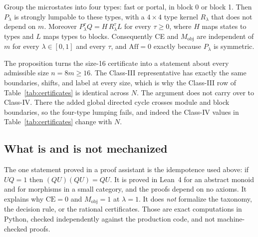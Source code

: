 \begin{proposition}
\label{prop:lumpability}
Group the microstates into four types: fast or portal, in block 0 or block 1. Then $P_\lambda$ is strongly lumpable to these types, with a $4\times4$ type kernel $R_\lambda$ that does not depend on $m$. Moreover $P_\lambda^{\tau}Q=H\,R_\lambda^{\tau}L$ for every $\tau\ge0$, where $H$ maps states to types and $L$ maps types to blocks. Consequently CE and $M_{\mathrm{obj}}$ are independent of $m$ for every $\lambda\in[0,1]$ and every $\tau$, and $\mathrm{Aff}=0$ exactly because $P_\lambda$ is symmetric.
\end{proposition}

The proposition turns the size-16 certificate into a statement about every admissible size $n=8m\ge16$. The Class-III representative has exactly the same boundaries, shifts, and label at every size, which is why the Class-III row of Table~\ref{tab:certificates} is identical across $N$. The argument does not carry over to Class-IV. There the added global directed cycle crosses module and block boundaries, so the four-type lumping fails, and indeed the Class-IV values in Table~\ref{tab:certificates} change with $N$.

\subsection{What is and is not mechanized}

The one statement proved in a proof assistant is the idempotence used above: if $UQ=1$ then $(QU)(QU)=QU$. It is proved in Lean~4 for an abstract monoid and for morphisms in a small category, and the proofs depend on no axioms. It explains why $\mathrm{CE}=0$ and $M_{\mathrm{obj}}=1$ at $\lambda=1$. It does \emph{not} formalize the taxonomy, the decision rule, or the rational certificates. Those are exact computations in Python, checked independently against the production code, and not machine-checked proofs.
